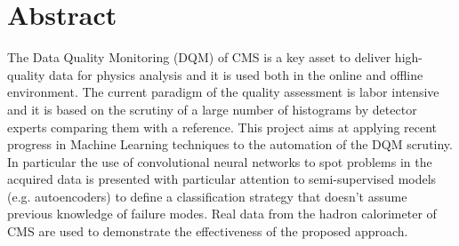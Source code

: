 \documentclass[12pt,twoside,openany]{book}
\begin{document}


\frontmatter
\chapter*{Abstract}
The Data Quality Monitoring (DQM) of CMS is a key asset to deliver high-quality data for physics analysis and it is used both in the online and offline environment. The current paradigm of the quality assessment is labor intensive and it is based on the scrutiny of a large number of histograms by detector experts comparing them with a reference. This project aims at applying recent progress in Machine Learning techniques to the automation of the DQM scrutiny. In particular the use of convolutional neural networks to spot problems in the acquired data is presented with particular attention to semi-supervised models (e.g. autoencoders) to define a classification strategy that doesn’t assume previous knowledge of failure modes. Real data from the hadron calorimeter of CMS are used to demonstrate the effectiveness of the proposed approach. 
\end{document}
